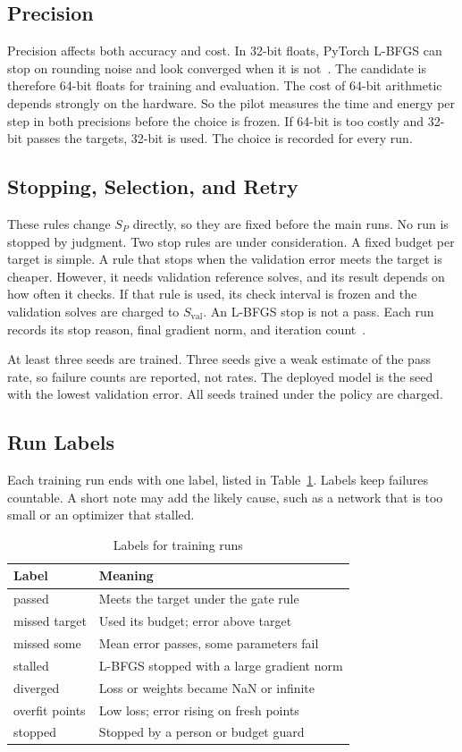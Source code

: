 \documentclass[journal]{IEEEtran}
\begin{document}
\subsection{Precision}
Precision affects both accuracy and cost. In 32-bit floats, PyTorch L-BFGS can stop on rounding noise and look converged when it is not~\cite{xu2025}. The candidate is therefore 64-bit floats for training and evaluation. The cost of 64-bit arithmetic depends strongly on the hardware. So the pilot measures the time and energy per step in both precisions before the choice is frozen. If 64-bit is too costly and 32-bit passes the targets, 32-bit is used. The choice is recorded for every run.

\subsection{Stopping, Selection, and Retry}
These rules change $S_P$ directly, so they are fixed before the main runs. No run is stopped by judgment. Two stop rules are under consideration. A fixed budget per target is simple. A rule that stops when the validation error meets the target is cheaper. However, it needs validation reference solves, and its result depends on how often it checks. If that rule is used, its check interval is frozen and the validation solves are charged to $S_{\mathrm{val}}$. An L-BFGS stop is not a pass. Each run records its stop reason, final gradient norm, and iteration count~\cite{rathore2024}.

At least three seeds are trained. Three seeds give a weak estimate of the pass rate, so failure counts are reported, not rates. The deployed model is the seed with the lowest validation error. All seeds trained under the policy are charged.

\subsection{Run Labels}
Each training run ends with one label, listed in Table~\ref{tab:labels}. Labels keep failures countable. A short note may add the likely cause, such as a network that is too small or an optimizer that stalled.

\begin{table}[t]
\caption{Labels for training runs}
\label{tab:labels}
\centering
\footnotesize
\setlength{\tabcolsep}{3pt}
\begin{tabular}{@{}lp{5.4cm}@{}}
\toprule
Label & Meaning \\
\midrule
passed & Meets the target under the gate rule \\
missed target & Used its budget; error above target \\
missed some & Mean error passes, some parameters fail \\
stalled & L-BFGS stopped with a large gradient norm \\
diverged & Loss or weights became NaN or infinite \\
overfit points & Low loss; error rising on fresh points \\
stopped & Stopped by a person or budget guard \\
\bottomrule
\end{tabular}
\end{table}
\end{document}
